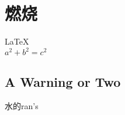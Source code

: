 \documentclass[UTF8]{article}
\begin{document}
       
 
\section{燃烧}          
\LaTeX \,\\ 
 $a^2+b^2=c^2$
 
\subsection{A Warning or Two}  

水的ran's
\end{document}
